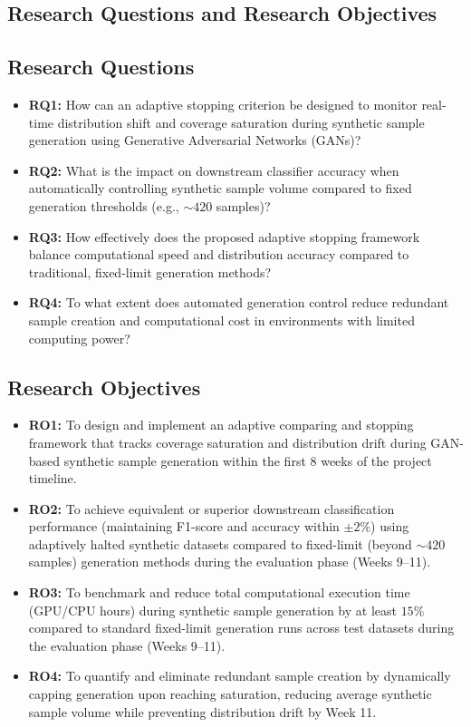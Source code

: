 \documentclass[12pt,a4paper]{report}
\begin{document}
\begin{justify}
\chapter{Research Questions and Research Objectives}

\section{Research Questions}

\begin{itemize}
    \item \textbf{RQ1:} How can an adaptive stopping criterion be designed to monitor real-time distribution shift and coverage saturation during synthetic sample generation using Generative Adversarial Networks (GANs)?
    \item \textbf{RQ2:} What is the impact on downstream classifier accuracy when automatically controlling synthetic sample volume compared to fixed generation thresholds (e.g., $\sim 420$ samples)?
    \item \textbf{RQ3:} How effectively does the proposed adaptive stopping framework balance computational speed and distribution accuracy compared to traditional, fixed-limit generation methods?
    \item \textbf{RQ4:} To what extent does automated generation control reduce redundant sample creation and computational cost in environments with limited computing power?
\end{itemize}

\section{Research Objectives}

\begin{itemize}
    \item \textbf{RO1:} To design and implement an adaptive comparing and stopping framework that tracks coverage saturation and distribution drift during GAN-based synthetic sample generation within the first 8 weeks of the project timeline. 
    \item \textbf{RO2:} To achieve equivalent or superior downstream classification performance (maintaining F1-score and accuracy within $\pm 2\%$) using adaptively halted synthetic datasets compared to fixed-limit (beyond $\sim 420$ samples) generation methods during the evaluation phase (Weeks 9--11).
    \item \textbf{RO3:} To benchmark and reduce total computational execution time (GPU/CPU hours) during synthetic sample generation by at least $15\%$ compared to standard fixed-limit generation runs across test datasets during the evaluation phase (Weeks 9--11).
    \item \textbf{RO4:} To quantify and eliminate redundant sample creation by dynamically capping generation upon reaching saturation, reducing average synthetic sample volume while preventing distribution drift by Week 11.
\end{itemize}



\end{justify}
\end{document}
